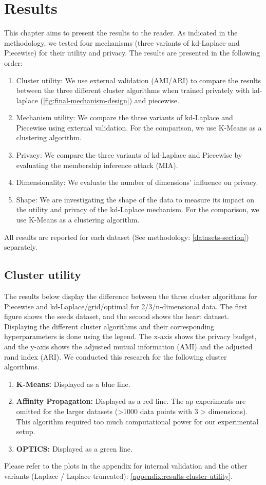 \chapter{Results}
This chapter aims to present the results to the reader.
As indicated in the methodology, we tested four mechanisms (three variants of kd-Laplace and Piecewise) for their utility and privacy.
The results are presented in the following order:
\begin{enumerate}
    \item Cluster utility: We use external validation (AMI/ARI) to compare the results between the three different cluster algorithms when trained privately with kd-laplace (\ref{fig:final-mechanism-design}) and piecewise.
    \item Mechanism utility: We compare the three variants of kd-Laplace and Piecewise using external validation. For the comparison, we use K-Means as a clustering algorithm.
    \item Privacy: We compare the three variants of kd-Laplace and Piecewise by evaluating the membership inference attack (MIA).
    \item Dimensionality: We evaluate the number of dimensions' influence on privacy.
    \item Shape: We are investigating the shape of the data to measure its impact on the utility and privacy of the kd-Laplace mechanism.
          For the comparison, we use K-Means as a clustering algorithm.
\end{enumerate}
All results are reported for each dataset (See methodology: \ref{datasets-section}) separately.
\newpage
\section{Cluster utility}
The results below display the difference between the three cluster algorithms for Piecewise and kd-Laplace/grid/optimal for 2/3/n-dimensional data.
The first figure shows the seeds dataset, and the second shows the heart dataset. \newline
Displaying the different cluster algorithms and their corresponding hyperparameters is done using the legend.
The x-axis shows the privacy budget, and the y-axis shows the adjusted mutual information (AMI) and the adjusted rand index (ARI).
We conducted this research for the following cluster algorithms.
\begin{enumerate}
    \item \textbf{K-Means:} Displayed as a blue line.
    \item \textbf{Affinity Propagation:} Displayed as a red line.
          The \gls{ap} experiments are omitted for the larger datasets (>1000 data points with 3 > dimensions).
          This algorithm required too much computational power for our experimental setup.
    \item \textbf{OPTICS:} Displayed as a green line.
\end{enumerate}
Please refer to the plots in the appendix for internal validation and the other variants (Laplace / Laplace-truncated): \ref{appendix:results-cluster-utility}.

